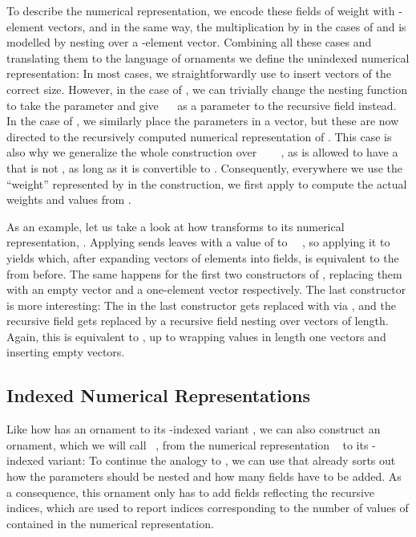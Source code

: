 To describe the numerical representation, we encode these fields of weight  with -element vectors, and in the same way, the multiplication by  in the cases of  and  is modelled by nesting over a -element vector. Combining all these cases and translating them to the language of ornaments we define the unindexed numerical representation:
In most cases, we straightforwardly use  to insert vectors of the correct size. However, in the case of , we can trivially change the nesting function to take the parameter  and give \ \  as a parameter to the recursive field instead. In the case of , we similarly place the parameters in a vector, but these are now directed to the recursively computed numerical representation of . This case is also why we generalize the whole construction over \ \AV{:} \ \ , as  is allowed to have a  that is not , as long as it is convertible to . Consequently, everywhere we use the ``weight'' represented by  in the construction, we first apply  to compute the actual weights and values from .

As an example, let us take a look at how  transforms  to its numerical representation, . Applying  sends leaves with a value of  to \ \ , so applying it to  yields
which, after expanding vectors of  elements into  fields, is equivalent to the  from before. The same happens for the first two constructors of , replacing them with an empty vector and a one-element vector respectively. The last constructor is more interesting:
The  in the last constructor gets replaced with  via , and the recursive field gets replaced by a recursive field nesting over vectors of length. Again, this is equivalent to , up to wrapping values in length one vectors and inserting empty vectors.


\subsection{Indexed Numerical Representations}\label{sec:itrieo}
Like how  has an ornament  to its \bN{}-indexed variant , we can also construct an ornament, which we will call \ , from the numerical representation \  to its -indexed variant:
To continue the analogy to , we can use that  already sorts out how the parameters should be nested and how many fields have to be added. As a consequence, this ornament only has to add fields reflecting the recursive indices, which are used to report indices corresponding to the number of values of  contained in the numerical representation.

